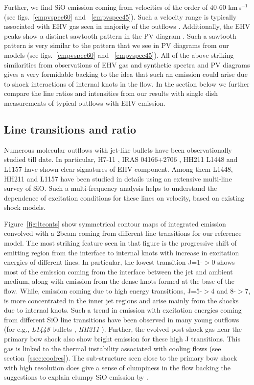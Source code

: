\documentclass[useAMS,usenatbib]{mn2e}
\begin{document}
Further, we find SiO emission coming from velocities 
of the order of 40-60 km\,s$^{-1}$ (see figs.~\ref{empvspec60} and
~\ref{empvspec45}). Such a velocity range is typically associated with
EHV gas seen in majority of the outflows \cite{Tafalla:2011p14051}. Additionally,
the EHV peaks show a distinct sawtooth pattern in the PV diagram
\cite{SantiagoGarcia:2009p13972}. Such a sawtooth pattern is very
similar to the pattern that we see in PV diagrams from
our models (see figs.~\ref{empvspec60} and ~\ref{empvspec45}). 
All of the above striking similarities from observations of EHV gas
and synthetic spectra and PV diagrams gives a very formidable backing
to the idea that such an emission could arise due to shock interactions of
internal knots in the flow. In the section below we further compare
the line ratios and intensities from our results with single dish
measurements of typical outflows with EHV emission.

\subsection{Line transitions and ratio}
Numerous molecular outflows with jet-like bullets have been
observationally studied till date. In particular, H7-11
\citep{Bachiller:1998p14725}, IRAS 04166+2706
\citep{SantiagoGarcia:2009p13972, Tafalla:2010p14759}, HH211 \citep{Nisini:2002p14418}
L1448 \citep{Bachiller:1991p14732,Nisini:2007p13128,
  Tafalla:2010p14759} and L1157 \citep{Nisini:2007p13128} have
shown clear signatures of EHV component. Among them L1448, HH211 and
L1157 have been studied in details using an extensive multi-line
survey of SiO. Such a multi-frequency analysis helps to understand the dependence of
excitation conditions for these lines on velocity, based on existing shock
models.  
%

Figure~\ref{fig:ltconts} show symmetrical contour maps of integrated 
emission convolved with a 2\arcsec beam coming from different line
transitions for our reference model. The most
striking feature seen in that figure is the progressive shift of
emitting region from the interface to internal knots with increase in
excitation energies of different lines. In particular, the lowest
transition J=1-$>$0 shows most of the emission coming from the
interface between the jet and ambient medium, along with emission from
the dense knots formed at the base of the flow. While, emission coming
due to high energy transitions, J=5-$>$4 and 8-$>$7, 
is more concentrated in the inner jet regions and arise mainly from
the shocks due to internal knots. Such a trend in emission with excitation energies coming from different SiO line transitions
have been observed in many young outflows (for e.g., {\it{L1448}}
bullets \citep{Nisini:2007p13128}, {\it{HH211}}
\citep{Chandler:2001p14376, Nisini:2002p14418,
  Hirano:2006p14411}). Further, the evolved post-shock gas near the
primary bow shock also show bright emission for these high J transitions. 
This gas is linked to the thermal instability associated with cooling flows (see
section~\ref{ssec:coolres}). The sub-structure seen close to the
primary bow shock with high resolution does give a sense of clumpiness
in the flow backing the suggestions to explain clumpy SiO emission by
\citealt{Chandler:2001p14376}.
%
\end{document}
